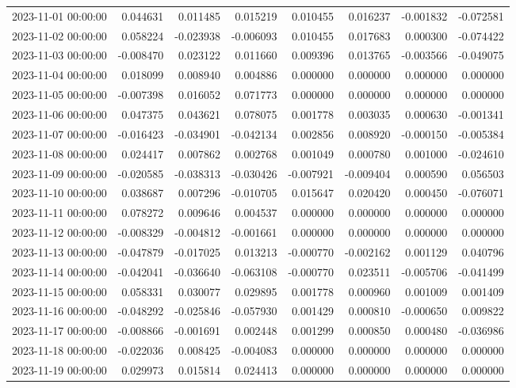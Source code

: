 \begin{tabular}{lrrrrrrr}
2023-11-01 00:00:00 & 0.044631 & 0.011485 & 0.015219 & 0.010455 & 0.016237 & -0.001832 & -0.072581 \\
2023-11-02 00:00:00 & 0.058224 & -0.023938 & -0.006093 & 0.010455 & 0.017683 & 0.000300 & -0.074422 \\
2023-11-03 00:00:00 & -0.008470 & 0.023122 & 0.011660 & 0.009396 & 0.013765 & -0.003566 & -0.049075 \\
2023-11-04 00:00:00 & 0.018099 & 0.008940 & 0.004886 & 0.000000 & 0.000000 & 0.000000 & 0.000000 \\
2023-11-05 00:00:00 & -0.007398 & 0.016052 & 0.071773 & 0.000000 & 0.000000 & 0.000000 & 0.000000 \\
2023-11-06 00:00:00 & 0.047375 & 0.043621 & 0.078075 & 0.001778 & 0.003035 & 0.000630 & -0.001341 \\
2023-11-07 00:00:00 & -0.016423 & -0.034901 & -0.042134 & 0.002856 & 0.008920 & -0.000150 & -0.005384 \\
2023-11-08 00:00:00 & 0.024417 & 0.007862 & 0.002768 & 0.001049 & 0.000780 & 0.001000 & -0.024610 \\
2023-11-09 00:00:00 & -0.020585 & -0.038313 & -0.030426 & -0.007921 & -0.009404 & 0.000590 & 0.056503 \\
2023-11-10 00:00:00 & 0.038687 & 0.007296 & -0.010705 & 0.015647 & 0.020420 & 0.000450 & -0.076071 \\
2023-11-11 00:00:00 & 0.078272 & 0.009646 & 0.004537 & 0.000000 & 0.000000 & 0.000000 & 0.000000 \\
2023-11-12 00:00:00 & -0.008329 & -0.004812 & -0.001661 & 0.000000 & 0.000000 & 0.000000 & 0.000000 \\
2023-11-13 00:00:00 & -0.047879 & -0.017025 & 0.013213 & -0.000770 & -0.002162 & 0.001129 & 0.040796 \\
2023-11-14 00:00:00 & -0.042041 & -0.036640 & -0.063108 & -0.000770 & 0.023511 & -0.005706 & -0.041499 \\
2023-11-15 00:00:00 & 0.058331 & 0.030077 & 0.029895 & 0.001778 & 0.000960 & 0.001009 & 0.001409 \\
2023-11-16 00:00:00 & -0.048292 & -0.025846 & -0.057930 & 0.001429 & 0.000810 & -0.000650 & 0.009822 \\
2023-11-17 00:00:00 & -0.008866 & -0.001691 & 0.002448 & 0.001299 & 0.000850 & 0.000480 & -0.036986 \\
2023-11-18 00:00:00 & -0.022036 & 0.008425 & -0.004083 & 0.000000 & 0.000000 & 0.000000 & 0.000000 \\
2023-11-19 00:00:00 & 0.029973 & 0.015814 & 0.024413 & 0.000000 & 0.000000 & 0.000000 & 0.000000 \\

\end{tabular}
